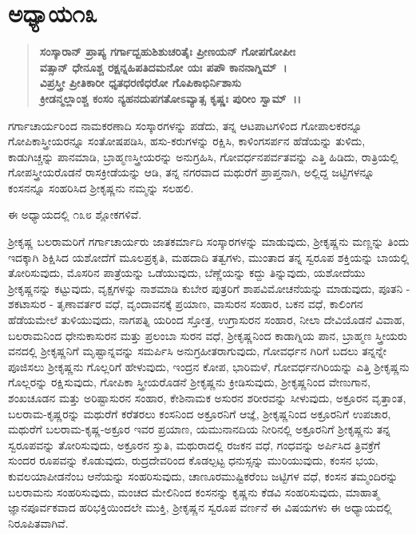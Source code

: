 \section*{ಅಧ್ಯಾಯ\enginline{-}೧೩}

\begin{verse}
\textbf{ಸಂಸ್ಕಾರಾನ್ ಪ್ರಾಪ್ಯ ಗರ್ಗಾದ್ಬಹುಶಿಶುಚರಿತೈಃ ಪ್ರೀಣಯನ್ ಗೋಪಗೋಪೀಃ} \\\textbf{ವತ್ಸಾನ್ ಧೇನೂಶ್ಚ ರಕ್ಷನ್ನಹಿಪತಿದಮನೋ ಯಃ ಪಪೌ ಕಾನನಾಗ್ನಿಮ್~।}\\\textbf{ ವಿಪ್ರಸ್ತ್ರೀ ಪ್ರೀತಿಕಾರೀ ಧೃತಧರಣಿಧರೋ ಗೊಪಿಕಾಭಿರ್ನಿಶಾಸು} \\\textbf{ಕ್ರೀಡನ್ಮಲ್ಲಾಂಶ್ಚ ಕಂಸಂ ನ್ಯಹನದುಪಗತೋಽವ್ಯಾತ್ಸ ಕೃಷ್ಣಃ ಪುರೀಂ ಸ್ವಾಮ್~।।}
\end{verse}

ಗರ್ಗಾಚಾರ್ಯರಿಂದ ನಾಮಕರಣಾದಿ ಸಂಸ್ಕಾರಗಳನ್ನು ಪಡೆದು, ತನ್ನ ಆಟಪಾಟಗಳಿಂದ ಗೋಪಾಲಕರನ್ನೂ ಗೋಪಿಕಾಸ್ತ್ರೀಯರನ್ನೂ ಸಂತೋಷಪಡಿಸಿ, ಹಸು-ಕರುಗಳನ್ನು ರಕ್ಷಿಸಿ, ಕಾಳಿಂಗಸರ್ಪನ ಹೆಡೆಯನ್ನು ತುಳಿದು, ಕಾಡುಗಿಚ್ಚನ್ನು ಪಾನಮಾಡಿ, ಬ್ರಾಹ್ಮಣಸ್ತ್ರೀಯರನ್ನು ಅನುಗ್ರಹಿಸಿ, ಗೋವರ್ಧನಪರ್ವತವನ್ನು ಎತ್ತಿ ಹಿಡಿದು, ರಾತ್ರಿಯಲ್ಲಿ ಗೋಪಸ್ತ್ರೀಯರೊಡನೆ ರಾಸಕ್ರೀಡೆಯನ್ನು ಆಡಿ, ತನ್ನ ನಗರವಾದ ಮಥುರೆಗೆ ಪ್ರಾಪ್ತನಾಗಿ, ಅಲ್ಲಿದ್ದ ಜಟ್ಟಿಗಳನ್ನೂ ಕಂಸನನ್ನೂ ಸಂಹರಿಸಿದ ಶ‍್ರೀಕೃಷ್ಣನು ನಮ್ಮನ್ನು ಸಲಹಲಿ.

ಈ ಅಧ್ಯಾಯದಲ್ಲಿ ೧೩೮ ಶ್ಲೋಕಗಳಿವೆ.

ಶ‍್ರೀಕೃಷ್ಣ ಬಲರಾಮರಿಗೆ ಗರ್ಗಾಚಾರ್ಯರು ಜಾತಕರ್ಮಾದಿ ಸಂಸ್ಕಾರಗಳನ್ನು ಮಾಡು\-ವುದು, ಶ‍್ರೀಕೃಷ್ಣನು ಮಣ್ಣನ್ನು ತಿಂದು ಇದಕ್ಕಾಗಿ ಶಿಕ್ಷಿಸಿದ ಯಶೋದೆಗೆ ಮೂಲಪ್ರಕೃತಿ, ಮಹದಾದಿ ತತ್ವಗಳು, ಮುಂತಾದ ತನ್ನ ಸ್ವರೂಪ ಶಕ್ತಿಯನ್ನು ಬಾಯಲ್ಲಿ ತೋರಿಸುವುದು, ಮೊಸರಿನ ಪಾತ್ರೆಯನ್ನು ಒಡೆಯುವುದು, ಬೆಣ್ಣೆಯನ್ನು ಕದ್ದು ತಿನ್ನುವುದು, ಯಶೋದೆಯು ಶ‍್ರೀಕೃಷ್ಣನನ್ನು ಕಟ್ಟುವುದು, ವೃಕ್ಷಗಳನ್ನು ನಾಶಮಾಡಿ ಕುಬೇರ ಪುತ್ರರಿಗೆ ಶಾಪವಿಮೋಚನೆಯನ್ನು ಮಾಡುವುದು, ಪೂತನಿ - ಶಕಟಾಸುರ - ತೃಣಾವರ್ತರ ವಧೆ, ವೃಂದಾವನಕ್ಕೆ ಪ್ರಯಾಣ, ವಾಸುರನ ಸಂಹಾರ, ಬಕನ ವಧೆ, ಕಾಲಿಂಗನ ಹೆಡೆಯಮೇಲೆ ತುಳಿಯುವುದು, ನಾಗಪತ್ನಿ ಯರಿಂದ ಸ್ತೋತ್ರ, ಉಗ್ರಾಸುರನ ಸಂಹಾರ, ನೀಲಾ ದೇವಿಯೊಡನೆ ವಿವಾಹ, ಬಲರಾಮನಿಂದ ಧೇನುಕಾಸುರನ ಮತ್ತು ಪ್ರಲಂಬಾ ಸುರನ ವಧೆ, ಶ‍್ರೀಕೃಷ್ಣನಿಂದ ಕಾಡಾಗ್ನಿಯ ಪಾನ, ಬ್ರಾಹ್ಮಣ ಸ್ತ್ರೀಯರು ವನದಲ್ಲಿ ಶ‍್ರೀಕೃಷ್ಣನಿಗೆ ಮೃಷ್ಟಾನ್ನವನ್ನು ಸಮರ್ಪಿಸಿ ಅನುಗ್ರಹೀತರಾಗುವುದು, ಗೋವರ್ಧನ ಗಿರಿಗೆ ಬದಲು ತನ್ನನ್ನೇ ಪೂಜಿಸಲು ಶ‍್ರೀಕೃಷ್ಣನು ಗೊಲ್ಲರಿಗೆ ಹೇಳುವುದು, ಇಂದ್ರನ ಕೋಪ, ಭಾರಿಮಳೆ, ಗೋವರ್ಧನಗಿರಿಯನ್ನು ಎತ್ತಿ ಶ‍್ರೀಕೃಷ್ಣನು ಗೊಲ್ಲರನ್ನು ರಕ್ಷಿಸುವುದು, ಗೋಪಿಕಾ ಸ್ತ್ರೀಯರೊಡನೆ ಶ‍್ರೀಕೃಷ್ಣನು ಕ್ರೀಡಿಸುವುದು, ಶ‍್ರೀಕೃಷ್ಣನಿಂದ ವೇಣುಗಾನ, ಶಂಖಚೂಡನ ಮತ್ತು ಅರಿಷ್ಟಾಸುರನ ಸಂಹಾರ, ಕೇಶಿನಾಮಕ ಅಸುರನ ಶರೀರವನ್ನು ಸೀಳುವುದು, ಅಕ್ರೂರನ ವೃತ್ತಾಂತ, ಬಲರಾಮ-ಕೃಷ್ಣರನ್ನು ಮಥುರೆಗೆ ಕರೆತರಲು ಕಂಸನಿಂದ ಅಕ್ರೂರನಿಗೆ ಆಜ್ಞೆ, ಶ‍್ರೀಕೃಷ್ಣನಿಂದ ಅಕ್ರೂರನಿಗೆ ಉಪಚಾರ, ಮಥುರೆಗೆ ಬಲರಾಮ-ಕೃಷ್ಣ-ಅಕ್ರೂರ ಇವರ ಪ್ರಯಾಣ, ಯಮುನಾನದಿಯ ನೀರಿನಲ್ಲಿ ಅಕ್ರೂರನಿಗೆ ಶ‍್ರೀಕೃಷ್ಣನು ತನ್ನ ಸ್ವರೂಪವನ್ನು ತೋರಿಸುವುದು, ಅಕ್ರೂರನ ಸ್ತುತಿ, ಮಥುರಾದಲ್ಲಿ ರಜಕನ ವಧೆ, ಗಂಧವನ್ನು ಅರ್ಪಿಸಿದ ತ್ರಿವಕ್ರೆಗೆ ಸುಂದರ ರೂಪವನ್ನು ಕೊಡುವುದು, ರುದ್ರದೇವರಿಂದ ಕೊಡಲ್ಪಟ್ಟ ಧನುಸ್ಸನ್ನು ಮುರಿಯುವುದು, ಕಂಸನ ಭಯ, ಕುವಲಯಾಪೀಡನೆಂಬ ಆನೆಯನ್ನು ಸಂಹರಿಸುವುದು, ಚಾಣೂರಮುಷ್ಟಿಕರೆಂಬ ಜಟ್ಟಿಗಳ ವಧೆ, ಕಂಸನ ತಮ್ಮಂದಿರನ್ನು ಬಲರಾಮನು ಸಂಹರಿಸುವುದು, ಮಂಚದ ಮೇಲಿನಿಂದ ಕಂಸನನ್ನು ಕೃಷ್ಣನು ಕೆಡವಿ ಸಂಹರಿಸುವುದು, ಮಾಹಾತ್ಮ ಜ್ಞಾನಪೂರ್ವಕವಾದ ಹರಿಭಕ್ತಿಯಿಂದಲೇ ಮುಕ್ತಿ, ಶ‍್ರೀಕೃಷ್ಣನ ಸ್ವರೂಪ ವರ್ಣನೆ ಈ ವಿಷಯಗಳು ಈ ಅಧ್ಯಾಯದಲ್ಲಿ ನಿರೂಪಿತವಾಗಿವೆ.


